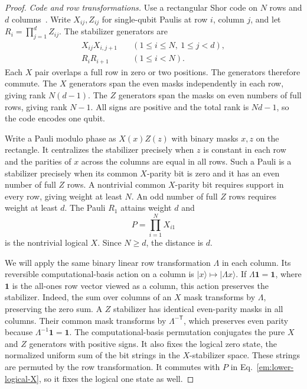 \documentclass[aps,prl,reprint,notitlepage,nofootinbib,nobibnotes]{revtex4-2}
\begin{document}
\begin{proof}
\emph{Code and row transformations.}
Use a rectangular Shor code on \(N\) rows and \(d\) columns~\cite{BaconCasaccino}. Write \(X_{ij},Z_{ij}\) for single-qubit Paulis at row \(i\), column \(j\), and let \(R_i=\prod_{j=1}^d Z_{ij}\). The stabilizer generators are
\begin{align}
 X_{ij}X_{i,j+1}
 &\quad (1\le i\le N,\ 1\le j<d),\nonumber\\
 R_iR_{i+1}
 &\quad (1\le i<N).
 \label{em:lower-stabilizers}
\end{align}
Each \(X\) pair overlaps a full row in zero or two positions. The generators therefore commute. The \(X\) generators span the even masks independently in each row, giving rank \(N(d-1)\). The \(Z\) generators span the masks on even numbers of full rows, giving rank \(N-1\). All signs are positive and the total rank is \(Nd-1\), so the code encodes one qubit.

Write a Pauli modulo phase as \(X(x)Z(z)\) with binary masks \(x,z\) on the rectangle. It centralizes the stabilizer precisely when \(z\) is constant in each row and the parities of \(x\) across the columns are equal in all rows. Such a Pauli is a stabilizer precisely when its common \(X\)-parity bit is zero and it has an even number of full \(Z\) rows. A nontrivial common \(X\)-parity bit requires support in every row, giving weight at least \(N\). An odd number of full \(Z\) rows requires weight at least \(d\). The Pauli \(R_1\) attains weight \(d\) and
\begin{equation}\label{em:lower-logical-X}
 P=\prod_{i=1}^N X_{i1}
\end{equation}
is the nontrivial logical \(X\). Since \(N\ge d\), the distance is \(d\).

We will apply the same binary linear row transformation \(\Lambda\) in each column. Its reversible computational-basis action on a column is \(|x\rangle\mapsto|\Lambda x\rangle\). If \(\Lambda\mathbf 1=\mathbf 1\), where \(\mathbf 1\) is the all-ones row vector viewed as a column, this action preserves the stabilizer. Indeed, the sum over columns of an \(X\) mask transforms by \(\Lambda\), preserving the zero sum. A \(Z\) stabilizer has identical even-parity masks in all columns. Their common mask transforms by \(\Lambda^{-\mathsf T}\), which preserves even parity because \(\Lambda^{-1}\mathbf 1=\mathbf 1\). The computational-basis permutation conjugates the pure \(X\) and \(Z\) generators with positive signs. It also fixes the logical zero state, the normalized uniform sum of the bit strings in the \(X\)-stabilizer space. These strings are permuted by the row transformation. It commutes with \(P\) in Eq.~\eqref{em:lower-logical-X}, so it fixes the logical one state as well.


\end{proof}
\end{document}

